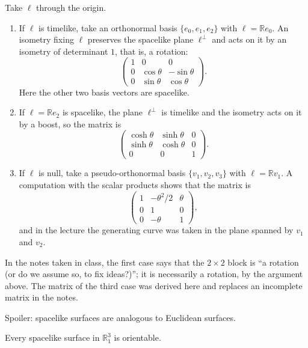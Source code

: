 \begin{remark}
\label{remark-palmas-rotation-groups}
Take $\ell$ through the origin.
\begin{enumerate}
\item If $\ell$ is timelike, take an
orthonormal basis $\{e_0,e_1,e_2\}$ with
$\ell=\mathbb{R}e_0$. An isometry fixing
$\ell$ preserves the spacelike plane
$\ell^{\perp}$ and acts on it by an
isometry of determinant $1$, that is, a
rotation:
$$
\begin{pmatrix}
1 & 0 & 0\\
0 & \cos\theta & -\sin\theta\\
0 & \sin\theta & \cos\theta
\end{pmatrix}.
$$
Here the other two basis vectors are
spacelike.
\item If $\ell=\mathbb{R}e_2$ is spacelike,
the plane $\ell^{\perp}$ is timelike and
the isometry acts on it by a boost, so the
matrix is
$$
\begin{pmatrix}
\cosh\theta & \sinh\theta & 0\\
\sinh\theta & \cosh\theta & 0\\
0 & 0 & 1
\end{pmatrix}.
$$
\item If $\ell$ is null, take a
pseudo-orthonormal basis
$\{v_1,v_2,v_3\}$ with $\ell=\mathbb{R}v_1$.
A computation with the scalar products
shows that the matrix is
$$
\begin{pmatrix}
1 & -\theta^2/2 & \theta\\
0 & 1 & 0\\
0 & -\theta & 1
\end{pmatrix},
$$
and in the lecture the generating curve
was taken in the plane spanned by $v_1$
and $v_2$.
\end{enumerate}
\end{remark}

In the notes taken in class, the first case
says that the $2\times 2$ block is ``a
rotation (or do we assume so, to fix
ideas?)''; it is necessarily a rotation, by
the argument above. The matrix of the third
case was derived here and replaces an
incomplete matrix in the notes.

Spoiler: spacelike surfaces are analogous
to Euclidean surfaces.

\begin{proposition}
\label{proposition-palmas-orientable}
Every spacelike surface in
$\mathbb{R}^3_1$ is orientable.
\end{proposition}

